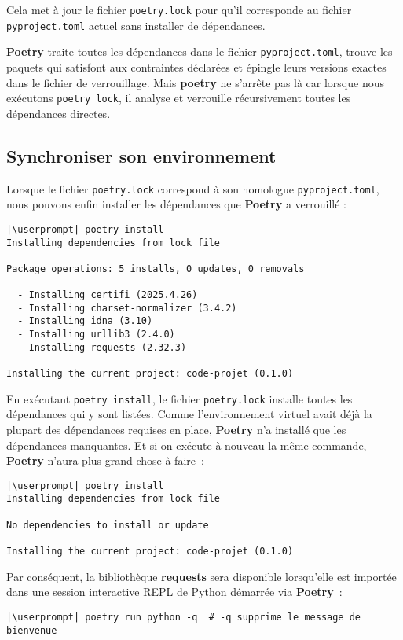 Cela met à jour le fichier \texttt{poetry.lock} pour qu’il corresponde au fichier \texttt{pyproject.toml} actuel sans installer de dépendances.

\textbf{Poetry} traite toutes les dépendances dans le fichier \texttt{pyproject.toml}, trouve les paquets qui satisfont aux contraintes déclarées et épingle leurs versions exactes dans le fichier de verrouillage. Mais \textbf{poetry} ne s’arrête pas là car lorsque nous exécutons \texttt{poetry lock}, il analyse et verrouille récursivement toutes les dépendances directes.

\subsection*{Synchroniser son environnement}
Lorsque le fichier \texttt{poetry.lock} correspond à son homologue \texttt{pyproject.toml}, nous pouvons enfin installer les dépendances que \textbf{Poetry} a verrouillé :
\begin{lstlisting}[style=bash]
|\userprompt| poetry install
Installing dependencies from lock file

Package operations: 5 installs, 0 updates, 0 removals

  - Installing certifi (2025.4.26)
  - Installing charset-normalizer (3.4.2)
  - Installing idna (3.10)
  - Installing urllib3 (2.4.0)
  - Installing requests (2.32.3)

Installing the current project: code-projet (0.1.0)
\end{lstlisting}

En exécutant \texttt{poetry install}, le fichier \texttt{poetry.lock} installe toutes les dépendances qui y sont listées. Comme l'environnement virtuel avait déjà la plupart des dépendances requises en place, \textbf{Poetry} n’a installé que les dépendances manquantes. Et si on exécute à nouveau la même commande, \textbf{Poetry} n’aura plus grand-chose à faire :
\begin{lstlisting}[style=bash]
|\userprompt| poetry install
Installing dependencies from lock file

No dependencies to install or update

Installing the current project: code-projet (0.1.0)
\end{lstlisting}

Par conséquent, la bibliothèque \textbf{requests} sera disponible lorsqu'elle est importée dans une session interactive REPL de Python démarrée via \textbf{Poetry} :
\begin{lstlisting}[style=bash]
|\userprompt| poetry run python -q  # -q supprime le message de bienvenue
\end{lstlisting}

